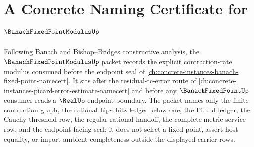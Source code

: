 \chapter{A Concrete Naming Certificate for $\BanachFixedPointModulusUp$}
\label{ch:concrete-instances-banach-fixed-point-modulus-namecert}

Following Banach and Bishop--Bridges constructive analysis, the $\BanachFixedPointModulusUp$ packet records the explicit contraction-rate modulus consumed before the endpoint seal of \autoref{ch:concrete-instances-banach-fixed-point-namecert}. It sits after the residual-to-error route of \autoref{ch:concrete-instances-picard-error-estimate-namecert} and before any $\BanachFixedPointUp$ consumer reads a $\RealUp$ endpoint boundary. The packet names only the finite contraction graph, the rational Lipschitz ledger below one, the Picard ledger, the Cauchy threshold row, the regular-rational handoff, the complete-metric service row, and the endpoint-facing seal; it does not select a fixed point, assert host equality, or import ambient completeness outside the displayed carrier rows.

